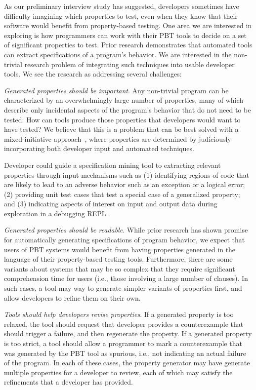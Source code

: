 As our preliminary interview study has suggested, developers sometimes have difficulty imagining which properties to test, even when they know that their software would benefit from property-based testing. One area we are interested in exploring is how programmers can work with their PBT tools to decide on a set of significant properties to test.
Prior research demonstrates that automated tools can extract specifications of a program's behavior\cite{ammons2002mining,le2018deep,claessen2010quickspec}. We are interested in the non-trivial research problem of integrating such techniques into usable developer tools. We see the research as addressing several challenges:

\textit{Generated properties should be \emph{important}}. Any non-trivial program can be characterized by an overwhelmingly large number of properties, many of which describe only incidental aspects of the program's behavior that do not need to be tested. How can tools produce those properties that developers would want to have tested? We believe that this is a problem that can be best solved with a mixed-initiative approach~\cite{allen1999mixed}, where properties are determined by judiciously incorporating both developer input and automated techniques.

Developer could guide a specification mining tool to extracting relevant properties through input mechanisms such as (1) identifying regions of code that are likely to lead to an adverse behavior such as an exception or a logical error; (2) providing unit test cases that test a special case of a generalized property; and (3) indicating aspects of interest on input and output data during exploration in a debugging REPL.

\textit{Generated properties should be \emph{readable}}. While prior research has shown promise for automatically generating specifications of program behavior, we expect that users of PBT systems would benefit from having properties generated in the language of their property-based testing tools. Furthermore, there are some variants about systems that may be so complex that they require significant comprehension time for users (i.e., those involving a large number of clauses). In such cases, a tool may way to generate simpler variants of properties first, and allow developers to refine them on their own.

\textit{Tools should help developers \emph{revise} properties}. If a generated property is too relaxed, the tool should request that developer provides a counterexample that should trigger a failure, and then regenerate the property. If a generated property is too strict, a tool should allow a programmer to mark a counterexample that was generated by the PBT tool as spurious, i.e., not indicating an actual failure of the program. In each of these cases, the property generator may have generate multiple properties for a developer to review, each of which may satisfy the refinements that a developer has provided.

